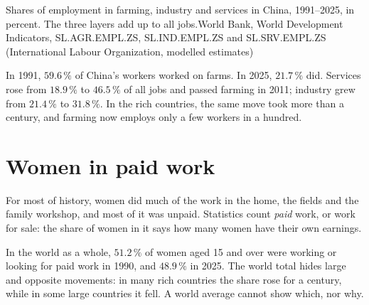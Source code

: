 \begin{omchart}{Shares of employment in farming, industry and services in China,
1991--2025, in percent. The three layers add up to all jobs.}{World Bank, World
Development Indicators, SL.AGR.EMPL.ZS, SL.IND.EMPL.ZS and SL.SRV.EMPL.ZS
(International Labour Organization, modelled estimates)}
\end{omchart}

In 1991, $59.6\,\%$ of China's workers worked on farms. In 2025, $21.7\,\%$ did.
Services rose from $18.9\,\%$ to $46.5\,\%$ of all jobs and passed farming in 2011;
industry grew from $21.4\,\%$ to $31.8\,\%$. In the rich countries, the same move
took more than a century, and farming now employs only a few workers in a
hundred.

\section{Women in paid work}

For most of history, women did much of the work in the home, the fields and the
family workshop, and most of it was unpaid. Statistics count
\emph{paid} work, or work for sale: the share of women in it says how many
women have their own earnings.

In the world as a whole, $51.2\,\%$ of women aged 15 and over were working or
looking for paid work in 1990, and $48.9\,\%$ in 2025. The world total hides
large and opposite movements: in many rich countries the share rose for a
century, while in some large countries it fell. A world average cannot show
which, nor why.

